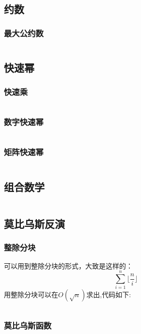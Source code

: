 \documentclass[a4paper,11pt]{article}
\begin{document}
\subsection{约数}
\subsubsection{最大公约数}
\inputminted[breaklines,linenos,frame=leftline]{c++}{math/gcd.cpp}

\subsection{快速幂}
\subsubsection{快速乘}
\inputminted[breaklines,linenos,frame=leftline]{c++}{math/quickpow3.cpp}
\subsubsection{数字快速幂}
\inputminted[breaklines,linenos,frame=leftline]{c++}{math/quickpow1.cpp}
\subsubsection{矩阵快速幂}
\inputminted[breaklines,linenos,frame=leftline]{c++}{math/quickpow2.cpp}

\subsection{组合数学}
\inputminted[breaklines,linenos,frame=leftline]{c++}{math/com.cpp}

\subsection{莫比乌斯反演}
\subsubsection{整除分块}
可以用到整除分块的形式，大致是这样的：
$$\sum_{i=1}^n \lfloor \frac{n}{i} \rfloor $$
用整除分块可以在$O  (\sqrt{n})$求出,代码如下:
\inputminted[breaklines,linenos,frame=leftline]{c++}{math/RemoveTheBlock.cpp}
\subsubsection{莫比乌斯函数}
\inputminted[breaklines,linenos,frame=leftline]{c++}{math/MobiusFunction.cpp}
\end{document}
